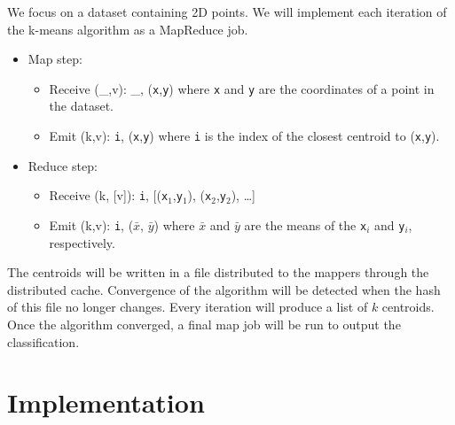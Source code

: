 \documentclass[11pt]{article}
\begin{document}
We focus on a dataset containing 2D points. We will implement each
iteration of the k-means algorithm as a MapReduce job.
\begin{itemize}
\item Map step:
  \begin{itemize}
  \item Receive (\_,v): \_, (\texttt{x},\texttt{y}) \newline
    where \texttt{x} and \texttt{y} are the coordinates of a point in the dataset.
  \item Emit (k,v): \texttt{i}, (\texttt{x},\texttt{y}) \newline
    where \texttt{i} is the index of the closest centroid to (\texttt{x},\texttt{y}).
  \end{itemize}
\item Reduce step:
  \begin{itemize}
  \item Receive (k, [v]): \texttt{i}, [(\texttt{x$_1$},\texttt{y$_1$}), (\texttt{x$_2$},\texttt{y$_2$}), \ldots]
  \item Emit (k,v): \texttt{i}, (\texttt{$\bar x$}, \texttt{$\bar y$}) \newline
    where \texttt{$\bar x$} and \texttt{$\bar y$} are the means of the \texttt{x$_i$} and \texttt{y$_i$}, respectively.
  \end{itemize}
\end{itemize}
The centroids will be written in a file distributed to the mappers
through the distributed cache. Convergence of the algorithm will be
detected when the hash of this file no longer changes. Every iteration
will produce a list of $k$ centroids. Once the algorithm converged, a
final map job will be run to output the classification.


\section{Implementation}
\end{document}
